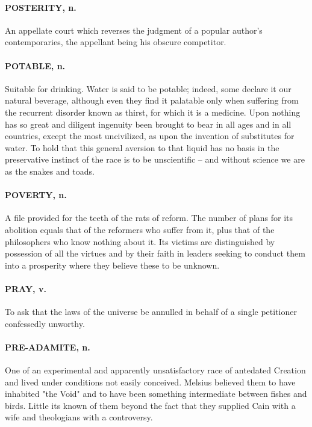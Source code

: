 \documentclass[11pt]{article}
\begin{document}
\paragraph{POSTERITY, n.}  An appellate court which reverses the judgment of a
popular author's contemporaries, the appellant being his obscure
competitor.

\paragraph{POTABLE, n.}  Suitable for drinking.  Water is said to be potable;
indeed, some declare it our natural beverage, although even they find
it palatable only when suffering from the recurrent disorder known as
thirst, for which it is a medicine.  Upon nothing has so great and
diligent ingenuity been brought to bear in all ages and in all
countries, except the most uncivilized, as upon the invention of
substitutes for water.  To hold that this general aversion to that
liquid has no basis in the preservative instinct of the race is to be
unscientific -- and without science we are as the snakes and toads.

\paragraph{POVERTY, n.}  A file provided for the teeth of the rats of reform.  The
number of plans for its abolition equals that of the reformers who
suffer from it, plus that of the philosophers who know nothing about
it.  Its victims are distinguished by possession of all the virtues
and by their faith in leaders seeking to conduct them into a
prosperity where they believe these to be unknown.

\paragraph{PRAY, v.}  To ask that the laws of the universe be annulled in behalf
of a single petitioner confessedly unworthy.

\paragraph{PRE-ADAMITE, n.}  One of an experimental and apparently unsatisfactory
race of antedated Creation and lived under conditions not easily
conceived.  Melsius believed them to have inhabited "the Void" and to
have been something intermediate between fishes and birds.  Little its
known of them beyond the fact that they supplied Cain with a wife and
theologians with a controversy.
\end{document}
